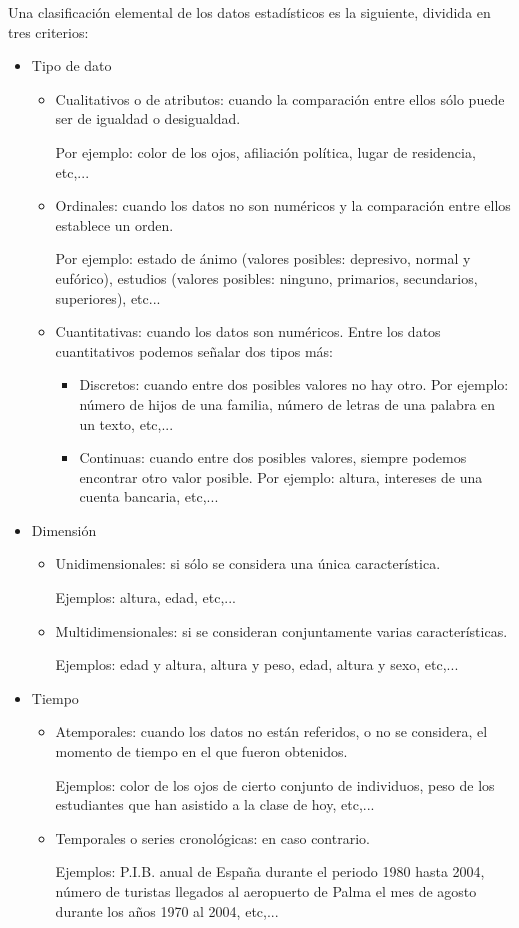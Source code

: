 \documentclass[12pt]{report}
\begin{document}
Una clasificación elemental de los datos estadísticos es la siguiente, dividida en tres
criterios:
\begin{itemize}
\item Tipo de dato
\begin{itemize}
\item Cualitativos o de atributos:  cuando la  comparación entre ellos sólo puede ser de igualdad o
desigualdad.

Por ejemplo: color de los ojos, afiliación política, lugar de residencia, etc,...
\item Ordinales: cuando los datos no son numéricos y la
comparación entre ellos establece un orden.

Por ejemplo: estado de ánimo (valores posibles: depresivo, normal y eufórico), estudios
(valores posibles: ninguno, primarios, secundarios, superiores), etc...
\item Cuantitativas: cuando los datos son
numéricos. Entre los datos cuantitativos podemos señalar dos tipos más:
\begin{itemize}
\item Discretos:  cuando entre dos posibles valores no hay otro.
Por ejemplo: número de  hijos de una familia, número de letras de una palabra en un
texto, etc,...
\item Continuas:  cuando  entre dos posibles valores, siempre podemos encontrar otro valor
posible. Por ejemplo: altura, intereses de una cuenta bancaria, etc,...
\end{itemize}
\end{itemize}
\item Dimensión
\begin{itemize}
\item Unidimensionales: si sólo se considera una única
característica.

Ejemplos: altura, edad, etc,...
\item Multidimensionales: si se consideran conjuntamente varias
características.

Ejemplos: edad y altura, altura y peso, edad, altura y sexo, etc,...
\end{itemize}
\item Tiempo
\begin{itemize}
\item Atemporales:
cuando los datos no están referidos, o no se considera, el momento de tiempo en el que
fueron obtenidos.

Ejemplos: color de los ojos de cierto conjunto de individuos, peso de los  estudiantes que han asistido a 
la clase  de hoy, etc,...
\item Temporales o series cronológicas: en caso contrario.

Ejemplos: P.I.B. anual de Espa\~{n}a durante el periodo 1980 hasta 2004, número de turistas
llegados al aeropuerto de  Palma el mes de agosto durante los a\~{n}os 1970 al 2004, etc,...
\end{itemize}
\end{itemize}
\end{document}
